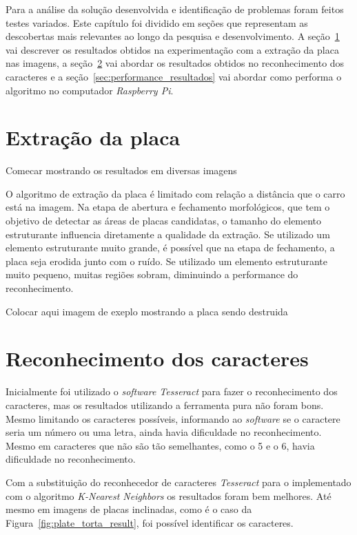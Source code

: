 Para a análise da solução desenvolvida e identificação de problemas foram feitos testes variados. Este capítulo foi dividido em seções que representam as descobertas mais relevantes ao longo da pesquisa e desenvolvimento. A seção~\ref{sec:extracao_da_placa_resultados} vai descrever os resultados obtidos na experimentação com a extração da placa nas imagens, a seção~\ref{sec:reconhecimento_dos_caracteres_resultados} vai abordar os resultados obtidos no reconhecimento dos caracteres e a seção~\ref{sec:performance_resultados} vai abordar como performa o algoritmo no computador \emph{Raspberry Pi}.

\section{Extração da placa}
\label{sec:extracao_da_placa_resultados}

Comecar mostrando os resultados em diversas imagens

O algoritmo de extração da placa é limitado com relação a distância que o carro está na imagem. Na etapa de abertura e fechamento morfológicos, que tem o objetivo de detectar as áreas de placas candidatas, o tamanho do elemento estruturante influencia diretamente a qualidade da extração. Se utilizado um elemento estruturante muito grande, é possível que na etapa de fechamento, a placa seja erodida junto com o ruído. Se utilizado um elemento estruturante muito pequeno, muitas regiões sobram, diminuindo a performance do reconhecimento. 

Colocar aqui imagem de exeplo mostrando a placa sendo destruida

\section{Reconhecimento dos caracteres}
\label{sec:reconhecimento_dos_caracteres_resultados}

Inicialmente foi utilizado o \emph{software Tesseract} para fazer o reconhecimento dos caracteres, mas os resultados utilizando a ferramenta pura não foram bons. Mesmo limitando os caracteres possíveis, informando ao \emph{software} se o caractere seria um número ou uma letra, ainda havia dificuldade no reconhecimento. Mesmo em caracteres que não são tão semelhantes, como o 5 e o 6, havia dificuldade no reconhecimento.

Com a substituição do reconhecedor de caracteres \emph{Tesseract} para o implementado com o algoritmo \emph{K-Nearest Neighbors} os resultados foram bem melhores. Até mesmo em imagens de placas inclinadas, como é o caso da Figura~\ref{fig:plate_torta_result}, foi possível identificar os caracteres.

